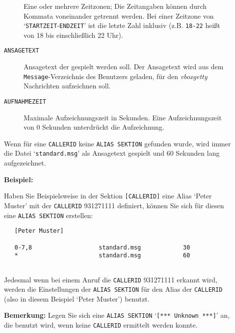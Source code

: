 \begin{description}
\begin{description}
Eine oder mehrere Zeitzonen; Die Zeitangaben k\"{o}nnen durch Kommata
voneinander getrennt werden. Bei einer Zeitzone von
`{\tt STARTZEIT}-{\tt ENDZEIT}' ist die letzte Zahl inklusiv
(z.B. {\tt 18-22} hei{\ss}t von 18 bis einschlie{\ss}lich 22 Uhr).



\item[{\tt ANSAGETEXT}] \mbox{}



Ansagetext der gespielt werden soll. Der Ansagetext wird aus dem
{\tt Message}-Verzeichnis des Benutzers geladen, f\"{u}r den
{\em vboxgetty\/} Nachrichten aufzeichnen soll.



\item[{\tt AUFNAHMEZEIT}] \mbox{}



Maximale Aufzeichnungszeit in Sekunden. Eine Aufzeichnungszeit von 0
Sekunden unterdr\"{u}ckt die Aufzeichnung.



\end{description}


Wenn f\"{u}r eine {\tt CALLERID} keine {\tt ALIAS SEKTION} gefunden
wurde, wird immer die Datei `{\tt standard.msg}' als Ansagetext
gespielt und 60 Sekunden lang aufgezeichnet.

{\bf Beispiel:}

Haben Sie Beispielsweise in der Sektion {\tt [CALLERID]} eine Alias
`Peter Muster' mit der {\tt CALLERID} 931271111 definiert, k\"{o}nnen Sie
sich f\"{u}r diesen eine {\tt ALIAS SEKTION} erstellen:

\begin{verbatim}
   [Peter Muster]

   0-7,8                   standard.msg            30
   *                       standard.msg            60
   
\end{verbatim}


Jedesmal wenn bei einem Anruf die {\tt CALLERID} 931271111 erkannt
wird, werden die Einstellungen der {\tt ALIAS SEKTION} f\"{u}r den Alias
der {\tt CALLERID} (also in diesem Beispiel `Peter Muster') benutzt.

{\bf Bemerkung:} Legen Sie sich eine {\tt ALIAS SEKTION} `{\tt [***
Unknown ***]}' an, die benutzt wird, wenn keine {\tt CALLERID}
ermittelt werden konnte.



\end{description}







